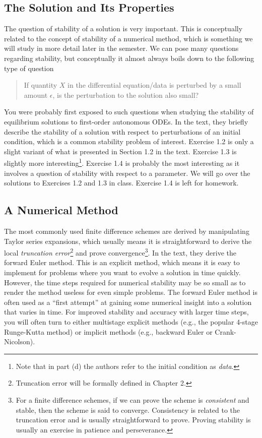 \documentclass{amsart}
\theoremstyle{plain}
\theoremstyle{definition}
\theoremstyle{remark}
\theoremstyle{definition}
\numberwithin{equation}{section}
\numberwithin{equation}{section}
\begin{document}
\subsection{The Solution and Its Properties}

The question of stability of a solution is very important.
This is conceptually related to the concept of stability of a numerical method, which is something we will study in more detail later in the semester.
We can pose many questions regarding stability, but conceptually it almost always boils down to the following type of question
\begin{quote}
	If quantity $X$ in the differential equation/data is perturbed by a small amount $\epsilon$, is the perturbation to the solution also small?
\end{quote}
You were probably first exposed to such questions when studying the stability of equilibrium solutions to first-order autonomous ODEs. 
In the text, they briefly describe the stability of a solution with respect to perturbations of an initial condition, which is a common stability problem of interest.  
Exercise 1.2 is only a slight variant of what is presented in Section 1.2 in the text.
Exercise 1.3 is slightly more interesting\footnote{Note that in part (d) the authors refer to the initial condition as {\em data}.}.
Exercise 1.4 is probably the most interesting as it involves a question of stability with respect to a parameter. 
We will go over the solutions to Exercises 1.2 and 1.3 in class.
Exercise 1.4 is left for homework. 

\subsection{A Numerical Method}

The most commonly used finite difference schemes are derived by manipulating Taylor series expansions, which usually means it is straightforward to derive the local {\em truncation error}\footnote{Truncation error will be formally defined in Chapter 2.} and prove convergence\footnote{For a finite difference schemes, if we can prove the scheme is {\em consistent} and stable, then the scheme is said to converge. Consistency is related to the truncation error and is usually straightforward to prove. Proving stability is usually an exercise in patience and perseverance.}.
In the text, they derive the forward Euler method.
This is an explicit method, which means it is easy to implement for problems where you want to evolve a solution in time quickly.
However, the time steps required for numerical stability may be so small as to render the method useless for even simple problems. 
The forward Euler method is often used as a ``first attempt'' at gaining some numerical insight into a solution that varies in time. 
For improved stability and accuracy with larger time steps, you will often turn to either multistage explicit methods (e.g., the popular 4-stage Runge-Kutta method) or implicit methods (e.g., backward Euler or Crank-Nicolson). 
\end{document}
